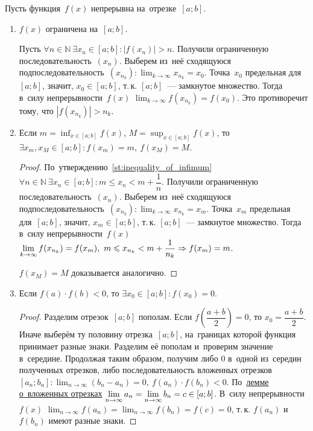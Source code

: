 Пусть функция~$f(x)$ непрерывна на~отрезке~$[a; b]$.
\begin{enumerate}
	\item $f(x)$ ограничена на~$[a; b]$.
	\begin{proofcontra}
	Пусть $\forall n \in \mathbb N \ \exists x_n \in [a; b] \colon |f(x_n)| > n$.
	Получили ограниченную последовательность~$(x_n)$.
	Выберем из~неё сходящуюся подпоследовательность~$\displaystyle (x_{n_k}) \colon \lim_{k \to \infty} x_{n_k} = x_0$.
	Точка~$x_0$ предельная для~$[a; b]$, значит, $x_0 \in [a; b]$, т.\,к. $[a; b]$~--- замкнутое множество.
	Тогда в~силу непрерывности~$f(x)$ $\displaystyle \lim_{k \to \infty} f(x_{n_k}) = f(x_0)$.
	Это противоречит тому, что $|f(x_{n_k})| > n_k$.
	\end{proofcontra}
	
	\item\label{st:continuous_function_takes_inf_and_sup} Если $\displaystyle m = \inf_{x \in [a; b]} f(x)$, $\displaystyle M = \sup_{x \in [a; b]} f(x)$, то $\exists x_m, x_M \in [a; b] \colon f(x_m) = m, \ f(x_M) = M$.
	\begin{proof}
	По~утверждению~\ref{st:inequality_of_infimum} $\forall n \in \mathbb N \ \exists x_n \in [a; b] \colon m \leqslant x_n < m + \dfrac1n$.
	Получили ограниченную последовательность~$(x_n)$.
	Выберем из~неё сходящуюся подпоследовательность~$\displaystyle (x_{n_k}) \colon \lim_{k \to \infty} x_{n_k} = x_m$.
	Точка~$x_m$ предельная для~$[a; b]$, значит, $x_m \in [a; b]$, т.\,к. $[a; b]$~--- замкнутое множество.
	Тогда в~силу непрерывности~$f(x)$ $\displaystyle \lim_{k \to \infty} f(x_{n_k}) = f(x_m), \ m \leqslant x_{n_k} < m + \frac1{n_k} \opbr\Rightarrow f(x_m) = m$.
	
	$f(x_M) = M$ доказывается аналогично.
	\end{proof}
	
	\item \begin{theorem}
	\label{th:zero_of_continuous_function}
	Если $f(a) \cdot f(b) < 0$, то $\exists x_0 \in [a; b] \colon f(x_0) = 0$.
	\end{theorem}
	\begin{proof}
	Разделим отрезок~$[a; b]$ пополам.
	Если $f\left( \dfrac{a + b}2 \right) = 0$, то $x_0 = \dfrac{a + b}2$.
	Иначе выберём ту половину отрезка~$[a; b]$, на~границах которой функция принимает разные знаки.
	Разделим её пополам и~проверим значение в~середине.
	Продолжая таким образом, получим либо $0$ в~одной из~середин полученных отрезков, либо последовательность вложенных отрезков~$\displaystyle [a_n; b_n] \colon \lim_{n \to \infty} (b_n - a_n) = 0, \ f(a_n) \cdot f(b_n) < 0$.
	По~\hyperref[lemma:about_nested_intervals]{лемме о~вложенных отрезках} $\displaystyle \lim_{n \to \infty} a_n \opbr= \lim_{n \to \infty} b_n \opbr= c \in [a; b]$.
	В~силу непрерывности~$f(x)$ $\displaystyle \lim_{n \to \infty} f(a_n) = \lim_{n \to \infty} f(b_n) = f(c) = 0$, т.\,к. $f(a_n)$ и~$f(b_n)$ имеют разные знаки.
	\end{proof}
	

\end{enumerate}
